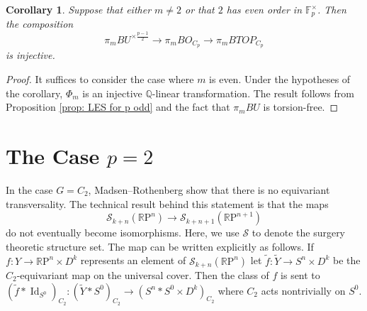 \documentclass[11pt, twoside]{amsart}
\theoremstyle{plain}
\newtheorem{cor}[theorem]{Corollary}
\theoremstyle{definition}
\theoremstyle{remark}
\newcommand{\Q}{\mathbb Q}
\newcommand{\F}{\mathbb F}
\newcommand{\RP}{\mathbb R\text{P}}
\newcommand{\op}[1]{\operatorname{{#1}}}
\newcommand{\mc}[1]{\mathcal{{#1}}}
\begin{document}
\begin{cor}\label{cor: ker BO->BTOP trivial}
Suppose that either $m\neq 2$ or that $2$ has even order in $\F_p^{\times}$.
Then the composition
\[
\pi_m BU^{\times\frac{p-1}{2}}\to \pi_m BO_{C_p}\to \pi_m BTOP_{C_p}
\]
is injective.
\end{cor}
\begin{proof}
It suffices to consider the case where $m$ is even.
Under the hypotheses of the corollary, $\Phi_m$ is an injective $\Q$-linear transformation.
The result follows from Proposition \ref{prop: LES for p odd} and the fact that $\pi_m BU$ is torsion-free.
\end{proof}

\section{The Case $p=2$}
In the case $G=C_2$, Madsen--Rothenberg \cite{MadsenRothenberg2} show that there is no equivariant transversality.
The technical result behind this statement is that the maps
\[
\mc{S}_{k+n}(\RP^n)\rightarrow \mc{S}_{k+n+1}(\RP^{n+1})
\] 
do not eventually become isomorphisms.
Here, we use $\mc{S}$ to denote the surgery theoretic structure set.
The map can be written explicitly as follows.
If $f:Y\rightarrow\RP^n\times D^k$ represents an element of $\mc{S}_{k+n}(\RP^n)$ let $\tilde{f}:\tilde{Y}\rightarrow S^n\times D^k$ be the $C_2$-equivariant map on the universal cover.
Then the class of $f$ is sent to $(\tilde{f}*\op{Id}_{S^0})_{C_2}:(\tilde{Y}*S^0)_{C_2}\rightarrow (S^n * S^0\times D^k)_{C_2}$ where $C_2$ acts nontrivially on $S^0$.
\end{document}
